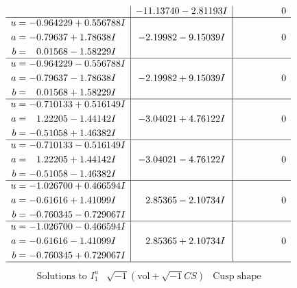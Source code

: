 \documentclass[1p]{elsarticle_modified}
\theoremstyle{definition}
\newcommand{\I}{\sqrt{-1}}
\begin{document}
$$\begin{array}{c|c|c}
 & -11.13740 - 2.81193 I & \phantom{-0.000000 } 0 \\ \hline\begin{aligned}
u &= -0.964229 + 0.556788 I \\
a &= -0.79637 + 1.78638 I \\
b &= \phantom{-}0.01568 - 1.58229 I\end{aligned}
 & -2.19982 - 9.15039 I & \phantom{-0.000000 } 0 \\ \hline\begin{aligned}
u &= -0.964229 - 0.556788 I \\
a &= -0.79637 - 1.78638 I \\
b &= \phantom{-}0.01568 + 1.58229 I\end{aligned}
 & -2.19982 + 9.15039 I & \phantom{-0.000000 } 0 \\ \hline\begin{aligned}
u &= -0.710133 + 0.516149 I \\
a &= \phantom{-}1.22205 - 1.44142 I \\
b &= -0.51058 + 1.46382 I\end{aligned}
 & -3.04021 + 4.76122 I & \phantom{-0.000000 } 0 \\ \hline\begin{aligned}
u &= -0.710133 - 0.516149 I \\
a &= \phantom{-}1.22205 + 1.44142 I \\
b &= -0.51058 - 1.46382 I\end{aligned}
 & -3.04021 - 4.76122 I & \phantom{-0.000000 } 0 \\ \hline\begin{aligned}
u &= -1.026700 + 0.466594 I \\
a &= -0.61616 + 1.41099 I \\
b &= -0.760345 - 0.729067 I\end{aligned}
 & \phantom{-}2.85365 - 2.10734 I & \phantom{-0.000000 } 0 \\ \hline\begin{aligned}
u &= -1.026700 - 0.466594 I \\
a &= -0.61616 - 1.41099 I \\
b &= -0.760345 + 0.729067 I\end{aligned}
 & \phantom{-}2.85365 + 2.10734 I & \phantom{-0.000000 } 0\\
 \hline 
 \end{array}$$\newpage$$\begin{array}{c|c|c}  
\text{Solutions to }I^u_{1}& \I (\text{vol} + \sqrt{-1}CS) & \text{Cusp shape}\\

\end{array}$$
\end{document}
